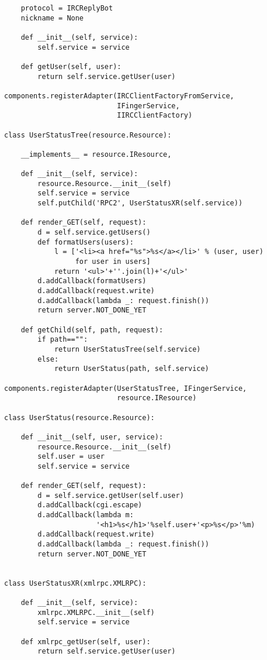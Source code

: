 \begin{verbatim}
    protocol = IRCReplyBot
    nickname = None

    def __init__(self, service):
        self.service = service

    def getUser(self, user):
        return self.service.getUser(user)

components.registerAdapter(IRCClientFactoryFromService,
                           IFingerService,
                           IIRCClientFactory)

class UserStatusTree(resource.Resource):

    __implements__ = resource.IResource,

    def __init__(self, service):
        resource.Resource.__init__(self)
        self.service = service
        self.putChild('RPC2', UserStatusXR(self.service))

    def render_GET(self, request):
        d = self.service.getUsers()
        def formatUsers(users):
            l = ['<li><a href="%s">%s</a></li>' % (user, user)
                 for user in users]
            return '<ul>'+''.join(l)+'</ul>'
        d.addCallback(formatUsers)
        d.addCallback(request.write)
        d.addCallback(lambda _: request.finish())
        return server.NOT_DONE_YET

    def getChild(self, path, request):
        if path=="":
            return UserStatusTree(self.service)
        else:
            return UserStatus(path, self.service)

components.registerAdapter(UserStatusTree, IFingerService,
                           resource.IResource)

class UserStatus(resource.Resource):

    def __init__(self, user, service):
        resource.Resource.__init__(self)
        self.user = user
        self.service = service

    def render_GET(self, request):
        d = self.service.getUser(self.user)
        d.addCallback(cgi.escape)
        d.addCallback(lambda m:
                      '<h1>%s</h1>'%self.user+'<p>%s</p>'%m)
        d.addCallback(request.write)
        d.addCallback(lambda _: request.finish())
        return server.NOT_DONE_YET


class UserStatusXR(xmlrpc.XMLRPC):

    def __init__(self, service):
        xmlrpc.XMLRPC.__init__(self)
        self.service = service

    def xmlrpc_getUser(self, user):
        return self.service.getUser(user)



\end{verbatim}
